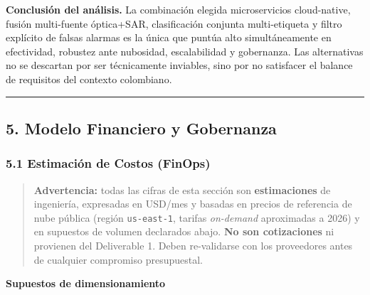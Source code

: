 \documentclass{article}
\newcommand{\mdhfour}[1]{\par\medskip\noindent\textbf{#1}\par\nobreak\smallskip}
\begin{document}
\textbf{Conclusión del análisis.} La combinación elegida \textemdash{}microservicios cloud-native, fusión multi-fuente óptica+SAR, clasificación conjunta multi-etiqueta y filtro explícito de falsas alarmas\textemdash{} es la única que puntúa alto simultáneamente en efectividad, robustez ante nubosidad, escalabilidad y gobernanza. Las alternativas no se descartan por ser técnicamente inviables, sino por no satisfacer el balance de requisitos del contexto colombiano.

\par\medskip\noindent\rule{\linewidth}{0.3pt}\par\medskip

\subsection{5. Modelo Financiero y Gobernanza}

\subsubsection{5.1 Estimación de Costos (FinOps)}

\begin{quote}
\textbf{Advertencia:} todas las cifras de esta sección son \textbf{estimaciones} de ingeniería, expresadas en USD/mes y basadas en precios de referencia de nube pública (región \texttt{us-\allowbreak{}east-\allowbreak{}1}, tarifas \emph{on-demand} aproximadas a 2026) y en supuestos de volumen declarados abajo. \textbf{No son cotizaciones} ni provienen del Deliverable 1. Deben re-validarse con los proveedores antes de cualquier compromiso presupuestal.
\end{quote}

\mdhfour{Supuestos de dimensionamiento}
\end{document}
